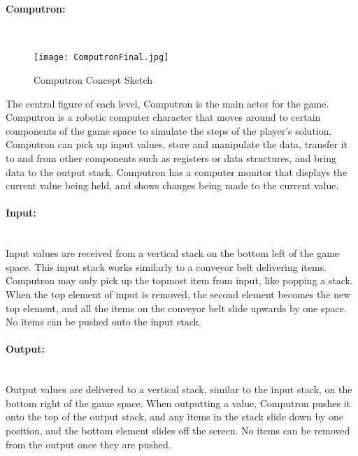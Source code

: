 \paragraph{Computron:} ~\\
\begin{figure}[H]
	\caption{Computron Concept Sketch}
	\label{fig:Computron_Concept_Sketch}
	\centering
	\texttt{[image: ComputronFinal.jpg]}
\end{figure}
The central figure of each level, Computron is the main actor for the game. Computron is 
a robotic computer character that moves around to certain components of the game space 
to simulate the steps of the player's solution. Computron can pick up input values, store 
and manipulate the data, transfer it to and from other components such as registers or data 
structures, and bring data to the output stack. Computron has a computer monitor that 
displays the current value being held, and shows changes being made to the current value.

\paragraph{Input:} ~\\
Input values are received from a vertical stack on the bottom left of the game space. This 
input stack works similarly to a conveyor belt delivering items. Computron may only pick 
up the topmost item from input, like popping a stack. When the top element of input is 
removed, the second element becomes the new top element, and all the items on the conveyor 
belt slide upwards by one space. No items can be pushed onto the input stack.

\paragraph{Output:} ~\\
Output values are delivered to a vertical stack, similar to the input stack, on the bottom right 
of the game space. When outputting a value, Computron pushes it onto the top of the output 
stack, and any items in the stack slide down by one position, and the bottom element slides 
off the screen. No items can be removed from the output once they are pushed.

